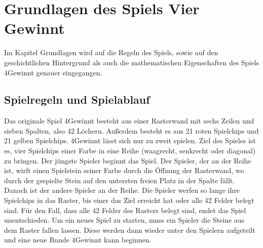 \chapter{Grundlagen des Spiels Vier Gewinnt}
Im Kapitel Grundlagen wird auf die Regeln des Spiels, sowie auf den geschichtlichen Hintergrund als auch die mathematischen Eigenschaften des Spiels 4Gewinnt genauer eingegangen. 

\section{Spielregeln und Spielablauf}

Das originale Spiel 4Gewinnt besteht aus einer Rasterwand mit sechs Zeilen und sieben Spalten, also 42 Löchern. Außerdem besteht es aus 21 roten Spielchips und 21 gelben Spielchips. 4Gewinnt lässt sich nur zu zweit spielen. Ziel des Spieles ist es, vier Spielchips einer Farbe in eine Reihe (waagrecht, senkrecht oder diagonal) zu bringen. Der jüngste Spieler beginnt das Spiel. Der Spieler, der an der Reihe ist, wirft einen Spielstein seiner Farbe durch die Öffnung der Rasterwand, wo durch der gespielte Stein auf den untersten freien Platz in der Spalte fällt. Danach ist der andere Spieler an der Reihe. Die Spieler werfen so lange ihre Spielchips in das Raster, bis einer das Ziel erreicht hat oder alle 42 Felder belegt sind. Für den Fall, dass alle 42 Felder des Rasters belegt sind, endet das Spiel unentschieden. Um ein neues Spiel zu starten, muss ein Spieler die Steine aus dem Raster fallen lassen. Diese werden dann wieder unter den Spielern aufgeteilt und eine neue Runde 4Gewinnt kann beginnen\autocite{Hasbro.2020}.


